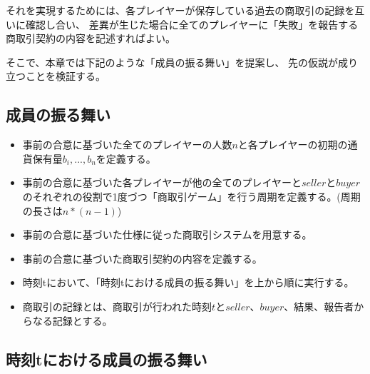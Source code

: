 それを実現するためには、各プレイヤーが保存している過去の商取引の記録を互いに確認し合い、
差異が生じた場合に全てのプレイヤーに「失敗」を報告する商取引契約の内容を記述すればよい。

そこで、本章では下記のような「成員の振る舞い」を提案し、
先の仮説が成り立つことを検証する。

\subsection{成員の振る舞い}
  \begin{itemize}
    \item 事前の合意に基づいた全てのプレイヤーの人数$n$と各プレイヤーの初期の通貨保有量$b_i, ..., b_n$を定義する。
    \item 事前の合意に基づいた各プレイヤーが他の全てのプレイヤーと$seller$と$buyer$のそれぞれの役割で1度づつ「商取引ゲーム」を行う周期を定義する。(周期の長さは$ n * (n-1)$)
    \item 事前の合意に基づいた仕様に従った商取引システムを用意する。
    \item 事前の合意に基づいた商取引契約の内容を定義する。
    \item 時刻tにおいて、「時刻tにおける成員の振る舞い」を上から順に実行する。
    \item 商取引の記録とは、商取引が行われた時刻$t$と$seller$、$buyer$、結果、報告者からなる記録とする。
  \end{itemize}

\subsection{時刻tにおける成員の振る舞い}
  
